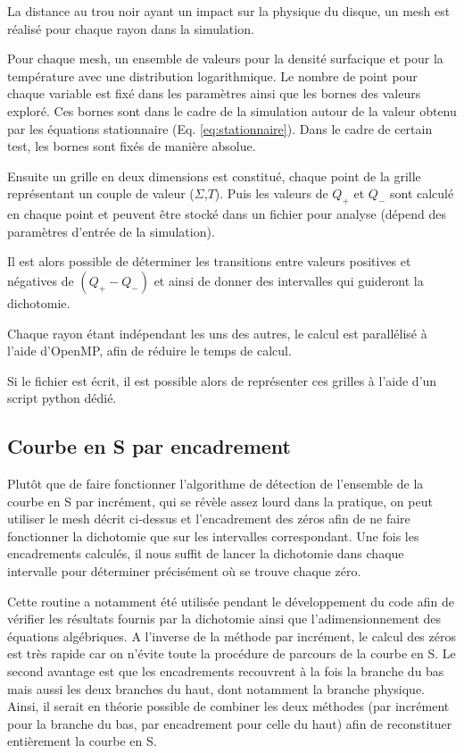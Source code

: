 \documentclass[a4paper,12pt]{article}
\begin{document}
La distance au trou noir ayant un impact sur la physique du disque, un mesh est réalisé pour chaque rayon dans la simulation. 

Pour chaque mesh, un ensemble de valeurs pour la densité surfacique et pour la température avec une distribution logarithmique. Le nombre de point pour chaque variable est fixé dans les paramètres ainsi que les bornes des valeurs exploré. Ces bornes sont dans le cadre de la simulation autour de la valeur obtenu par les équations stationnaire (Eq. \ref{eq:stationnaire}). Dans le cadre de certain test, les bornes sont fixés de manière absolue.

Ensuite un grille en deux dimensions est constitué, chaque point de la grille représentant un couple de valeur ($\Sigma$,$T$). Puis les valeurs de $Q_+$ et $Q_-$ sont calculé en chaque point et peuvent être stocké dans un fichier pour analyse (dépend des paramètres d'entrée de la simulation).

Il est alors possible de déterminer les transitions entre valeurs positives et négatives de $(Q_+-Q_-)$ et ainsi de donner des intervalles qui guideront la dichotomie.

Chaque rayon étant indépendant les uns des autres, le calcul est parallélisé à l'aide d'OpenMP, afin de réduire le temps de calcul.

Si le fichier est écrit, il est possible alors de représenter ces grilles à l'aide d'un script python dédié.



        \subsection{Courbe en S par encadrement}
            Plutôt que de faire fonctionner l'algorithme de détection de l'ensemble de la courbe en S par incrément, qui se révèle assez lourd dans la pratique, on peut utiliser le mesh décrit ci-dessus et l'encadrement des zéros afin de ne faire fonctionner la dichotomie que sur les intervalles correspondant. Une fois les encadrements calculés, il nous suffit de lancer la dichotomie dans chaque intervalle pour déterminer précisément où se trouve chaque zéro.\newline
             
            Cette routine a notamment été utilisée pendant le développement du code afin de vérifier les résultats fournis par la dichotomie ainsi que l'adimensionnement des équations algébriques. \newline
            A l'inverse de la méthode par incrément, le calcul des zéros est très rapide car on n'évite toute la procédure de parcours de la courbe en S. Le second avantage est que les encadrements recouvrent à la fois la branche du bas mais aussi les deux branches du haut, dont notamment la branche physique. Ainsi, il serait en théorie possible de combiner les deux méthodes (par incrément pour la branche du bas, par encadrement pour celle du haut) afin de reconstituer entièrement la courbe en S.\newline
            
\end{document}
